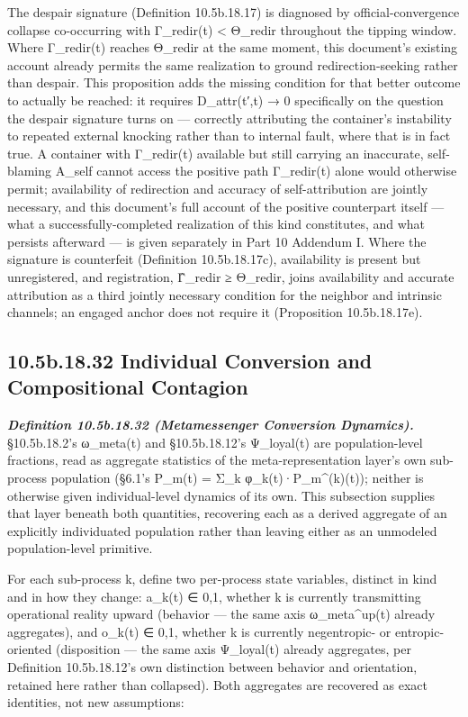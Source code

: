 \documentclass[
]{article}
\begin{document}
The despair signature (Definition 10.5b.18.17) is diagnosed by
official-convergence collapse co-occurring with Γ\_redir(t) \textless{}
Θ\_redir throughout the tipping window. Where Γ\_redir(t) reaches
Θ\_redir at the same moment, this document's existing account already
permits the same realization to ground redirection-seeking rather than
despair. This proposition adds the missing condition for that better
outcome to actually be reached: it requires D\_attr(t′,t) → 0
specifically on the question the despair signature turns on ---
correctly attributing the container's instability to repeated external
knocking rather than to internal fault, where that is in fact true. A
container with Γ\_redir(t) available but still carrying an inaccurate,
self-blaming A\_self cannot access the positive path Γ\_redir(t) alone
would otherwise permit; availability of redirection and accuracy of
self-attribution are jointly necessary, and this document's full account
of the positive counterpart itself --- what a successfully-completed
realization of this kind constitutes, and what persists afterward --- is
given separately in Part 10 Addendum I. Where the signature is
counterfeit (Definition 10.5b.18.17c), availability is present but
unregistered, and registration, Γ̂\_redir ≥ Θ\_redir, joins availability
and accurate attribution as a third jointly necessary condition for the
neighbor and intrinsic channels; an engaged anchor does not require it
(Proposition 10.5b.18.17e).

\hypertarget{b.18.32-individual-conversion-and-compositional-contagion}{%
\subsection{10.5b.18.32 Individual Conversion and Compositional
Contagion}\label{b.18.32-individual-conversion-and-compositional-contagion}}

\emph{\textbf{Definition 10.5b.18.32 (Metamessenger Conversion
Dynamics).}} §10.5b.18.2's ω\_meta(t) and §10.5b.18.12's Ψ\_loyal(t) are
population-level fractions, read as aggregate statistics of the
meta-representation layer's own sub-process population (§6.1's P\_m(t) =
Σ\_k φ\_k(t)·P\_m\^{}(k)(t)); neither is otherwise given
individual-level dynamics of its own. This subsection supplies that
layer beneath both quantities, recovering each as a derived aggregate of
an explicitly individuated population rather than leaving either as an
unmodeled population-level primitive.

For each sub-process k, define two per-process state variables, distinct
in kind and in how they change: a\_k(t) ∈ 0,1, whether k is currently
transmitting operational reality upward (behavior --- the same axis
ω\_meta\^{}up(t) already aggregates), and o\_k(t) ∈ 0,1, whether k is
currently negentropic- or entropic-oriented (disposition --- the same
axis Ψ\_loyal(t) already aggregates, per Definition 10.5b.18.12's own
distinction between behavior and orientation, retained here rather than
collapsed). Both aggregates are recovered as exact identities, not new
assumptions:
\end{document}
